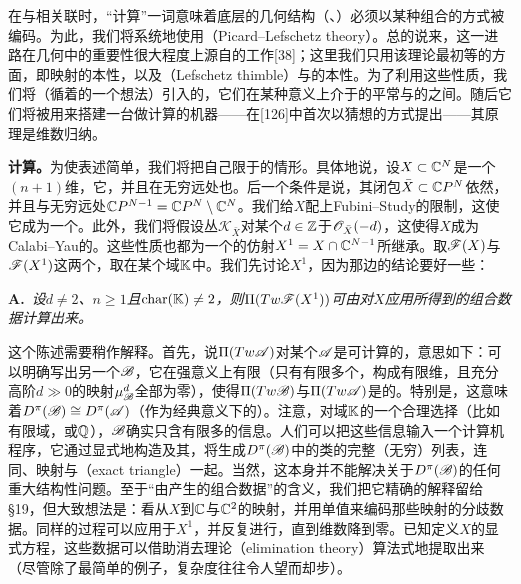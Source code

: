 在与\trFukayaCategory{}相关联时，“计算”一词意味着底层的几何结构（\trSymplectic\trManifold、\trLagrange\trSubmanifold）必须以某种组合的方式被编码。为此，我们将系统地使用\textbf{\trPicardLefschetzTheory}（Picard--Lefschetz theory）。总的说来，这一进路在\trSymplectic{}几何中的重要性很大程度上源自\trDonaldson{}的工作[38]；这里我们只用该理论最初等的方面，即\trMonodromy{}映射的\trSymplectic{}本性，以及\trLefschetzThimble（Lefschetz thimble）与\trVanishingCycle{}的\trLagrange{}本性。为了利用这些性质，我们将（循着\trKontsevich{}的一个想法）引入\trLefschetzFibration{}的\trFukayaCategory，它们在某种意义上介于\trTotalSpace{}的平常\trFukayaCategory{}与\trSmooth\trFiber{}的\trFukayaCategory{}之间。随后它们将被用来搭建一台做计算的机器——在[126]中首次以猜想的方式提出——其原理是维数归纳。

\textbf{计算\trFukayaCategory。}为使表述简单，我们将把自己限于\trAlgebraicVariety{}的情形。具体地说，设$X \subset \mathbb{C}^N$是一个$(n+1)$维\trAffineVariety，它\trSmooth，并且在无穷远处也\trSmooth。后一个条件是说，其闭包$\bar{X} \subset \mathbb{C}P^N$依然\trSmooth，并且与无穷远处\trHyperplane{}$\mathbb{C}P^{N-1} = \mathbb{C}P^N \setminus \mathbb{C}^N$\trTransverse。我们给$X$配上Fubini--Study\trKaehler\trForm{}的限制，这使它成为一个\trExactSymplectic\trManifold。此外，我们将假设\trCanonical{}丛$\mathcal{K}_{\bar{X}}$对某个$d \in \mathbb{Z}$\trIsomorphic{}于$\mathscr{O}_{\bar{X}}(-d)$，这使得$X$成为Calabi--Yau的。这些性质也都为一个\trGeneric{}的仿射\trHyperplaneSection{}$X^1 = X \cap \mathbb{C}^{N-1}$所继承。取$\mathscr{F}(X)$与$\mathscr{F}(X^1)$这两个\trFukayaCategory，\trCoefficients{}取在某个域$\mathbb{K}$中。我们先讨论$X^1$，因为那边的结论要好一些：

\textbf{\trhTheorem{} A.}\ \emph{设$d \neq 2$、$n \geq 1$且$\mathrm{char}(\mathbb{K}) \neq 2$，则$\Pi(Tw\mathscr{F}(X^1))$可由对$X$应用\trPicardLefschetzTheory{}所得到的组合数据计算出来。}

这个陈述需要稍作解释。首先，说$\Pi(Tw\mathscr{A})$对某个\trACategory{}$\mathscr{A}$是可计算的，意思如下：可以明确写出另一个\trACategory{}$\mathscr{B}$，它在强意义上有限（\trObject{}只有有限多个，\trMorphism{}构成有限维\trVectorSpace，且充分高阶$d \gg 0$的\trComposition{}映射$\mu^d_{\mathscr{B}}$全部为零），使得$\Pi(Tw\mathscr{B})$与$\Pi(Tw\mathscr{A})$是\trQuasiequivalence{}的\trACategory。特别是，这意味着$D^\pi(\mathscr{B}) \cong D^\pi(\mathscr{A})$（作为经典意义下的\trTriangulated{}\trCategory）。注意，对\trCoefficients{}域$\mathbb{K}$的一个合理选择（比如有限域，或$\mathbb{Q}$），$\mathscr{B}$确实只含有限多的信息。人们可以把这些信息输入一个计算机程序，它通过显式地构造\trTwistedComplex{}及其\trIdempotent\trEndomorphism，将生成$D^\pi(\mathscr{B})$中\trObject{}的\trIsomorphism{}类的完整（无穷）列表，连同\trMorphism、\trComposition{}映射与\textbf{\trExactTriangle}（exact triangle）一起。当然，这本身并不能解决关于$D^\pi(\mathscr{B})$的任何重大结构性问题。至于“由\trPicardLefschetzTheory{}产生的组合数据”的含义，我们把它精确的解释留给§19，但大致想法是：看从$X$到$\mathbb{C}$与$\mathbb{C}^2$的\trLinear{}映射，并用\trBraid{}单值来编码那些映射的分歧数据。同样的过程可以应用于$X^1$，并反复进行，直到维数降到零。已知定义$X$的显式方程，这些数据可以借助消去理论（elimination theory）算法式地提取出来（尽管除了最简单的例子，复杂度往往令人望而却步）。


